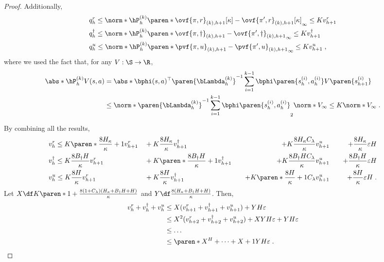 \begin{proof}
Additionally, 
\begin{align*}
&q_h^r \leq \norm*{ \hP^{(k)}_h \paren*{\ovf{\pi, r}_{(k), h+1}[\kappa]  - \ovf{\pi', r}_{(k), h+1}[\kappa]} }_\infty \leq K v_{h+1}^r\\
&q_h^\dagger \leq \norm*{ \hP^{(k)}_h \paren*{\ovf{\pi, \dagger}_{(k), h+1}  - \ovf{\pi', \dagger}_{(k), h+1}} }_\infty \leq K v_{h+1}^\dagger\\
&q_h^u \leq \norm*{ \hP^{(k)}_h \paren*{\pvf{\pi, u}_{(k), h+1}  - \pvf{\pi', u}_{(k), h+1}} }_\infty \leq K v_{h+1}^u\;,
\end{align*}
where we used the fact that, for any $V: \S \to \R$,
\begin{align*}
\abs*{\hP^{(k)}_h V}(s, a)
&= 
\abs*{{\bphi(s, a)^{\top}\paren{\bLambda^{(k)}_h}^{-1} \sum_{i=1}^{k-1}\bphi\paren{s_h^{(i)}, a_h^{(i)}} V\paren{s_{h+1}^{(i)}}}}\\
&\leq \norm*{{\paren{\bLambda^{(k)}_h}^{-1} \sum_{i=1}^{k-1}\bphi\paren{s_h^{(i)}, a_h^{(i)}} }}_2 \norm*{V}_\infty
\leq K \norm*{V}_\infty\;.
\end{align*}

By combining all the results, 
\begin{align*}
&v_h^r \leq 
K\paren*{\frac{8H_\kappa}{\kappa} + 1} v_{h+1}^r
&&+K\frac{8H_\kappa}{\kappa} v_{h+1}^\dagger
&&&+ K\frac{8H_\kappa C_\lambda}{\kappa} v_{h+1}^u
&&&&+ \frac{8H_\kappa}{\kappa} \varepsilon H\\
&v_h^\dagger \leq 
K\frac{8B_\dagger H}{\kappa} v_{h+1}^r
&&+K\paren*{\frac{8B_\dagger H}{\kappa} + 1}  v_{h+1}^\dagger
&&&+ K\frac{8B_\dagger H C_\lambda}{\kappa} v_{h+1}^u
&&&&+ \frac{8B_\dagger H}{\kappa} \varepsilon H\\
&v_h^u \leq 
K\frac{8 H}{\kappa} v_{h+1}^r
&&+K\frac{8 H}{\kappa}  v_{h+1}^\dagger
&&&+ K\paren*{\frac{8H}{\kappa} + 1}C_\lambda v_{h+1}^u
&&&&+ \frac{8H}{\kappa} \varepsilon H\;.
\end{align*}
Let 
$X \df K \paren*{1 + \frac{8(1+C_\lambda)(H_\kappa + B_\dagger H + H)}{\kappa}}$ 
and 
$Y \df \frac{8(H_\kappa + B_\dagger H + H)}{\kappa}$.
Then,
\begin{align*}
v_h^r + v_h^\dagger + v_h^u 
&\leq  X(v_{h+1}^r + v_{h+1}^\dagger + v_{h+1}^u) + Y H \varepsilon\\
&\leq  X^2(v_{h+2}^r + v_{h+2}^\dagger + v_{h+2}^u) + XY H\varepsilon + Y H \varepsilon \\
&\leq \dots\\
&\leq \paren*{X^H+ \dots + X+ 1}Y H \varepsilon \;. 
\end{align*}
\end{proof}

